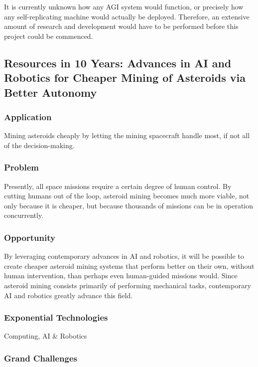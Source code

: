 \documentclass[english]{article}
\begin{document}
It is currently unknown how any AGI system would function, or precisely
how any self-replicating machine would actually be deployed. Therefore,
an extensive amount of research and development would have to be performed
before this project could be commenced.


\subsection{Resources in 10 Years: Advances in AI and Robotics for Cheaper Mining
of Asteroids via Better Autonomy}


\subsubsection{Application}

Mining asteroids cheaply by letting the mining spacecraft handle most,
if not all of the decision-making.


\subsubsection{Problem}

Presently, all space missions require a certain degree of human control.
By cutting humans out of the loop, asteroid mining becomes much more
viable, not only because it is cheaper, but because thousands of missions
can be in operation concurrently.


\subsubsection{Opportunity}

By leveraging contemporary advances in AI and robotics, it will be
possible to create cheaper asteroid mining systems that perform better
on their own, without human intervention, than perhaps even human-guided
missions would. Since asteroid mining consists primarily of performing
mechanical tasks, contemporary AI and robotics greatly advance this
field.


\subsubsection{Exponential Technologies}

Computing, AI \& Robotics


\subsubsection{Grand Challenges}
\end{document}
